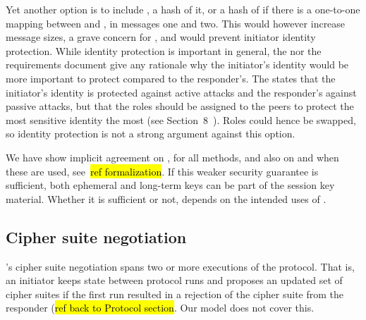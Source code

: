 \documentclass[runningheads,draft,x11names]{llncs}
\begin{document}
Yet another option is to include \mGi{}, a hash of it, or a hash of \mIdcredi{}
if there is a one-to-one mapping between \mIdcredi{} and \mGi{}, in messages one
and two.
%
This would however increase message sizes, a grave concern for \mEdhoc{}, and
would prevent initiator identity protection.
%
While identity protection is important in general, the \mSpec{} nor the
requirements document give any rationale why the initiator's identity would be
more important to protect compared to the responder's.
%
The \mSpec{} states that the
initiator's identity is protected against active attacks and the responder's
against passive attacks, but that the roles should be assigned to the \mCoap{}
peers to protect the most sensitive identity the most (see
Section~8~\cite{selander-lake-edhoc-01}).
%
Roles could hence be swapped, so identity protection is not a strong argument
against this option.
%

We have show implicit agreement on \mGx{}, \mGy{} for all methods, and also on
\mGiy{} and \mGrx{} when these are used, see~\hl{ref formalization}.
%
If this weaker security guarantee is sufficient, both ephemeral and long-term
keys can be part of the session key material.
%
Whether it is sufficient or not, depends on the intended uses of \mEdhoc{}.
%

\subsection{Cipher suite negotiation}
\label{sec:ciphersuiteNegotiation}
%
\mEdhoc{}'s cipher suite negotiation spans two or more executions of the protocol.
%
That is, an initiator keeps state between protocol runs and proposes an updated
set of cipher suites if the first run resulted in a rejection of the
cipher suite from the responder (\hl{ref back to Protocol section}.
%
Our model does not cover this.
%
\end{document}
